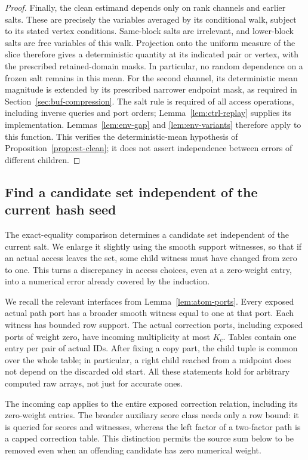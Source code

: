 \begin{proof}
Finally, the clean estimand depends only on rank channels and earlier
salts.  These are precisely the variables averaged by its conditional
walk, subject to its stated vertex conditions.  Same-block salts are
irrelevant, and lower-block salts are free variables of this walk.
Projection onto the uniform measure of the slice therefore gives a
deterministic quantity at its indicated pair or vertex, with the
prescribed retained-domain masks.  In particular, no random dependence
on a frozen salt remains in this mean.  For the second channel, its
deterministic mean magnitude is extended by its prescribed narrower
endpoint mask, as required in Section~\ref{sec:buf-compression}.
The salt rule is required of all access operations, including inverse
queries and port orders; Lemma~\ref{lem:ctrl-replay} supplies its
implementation.  Lemmas~\ref{lem:env-gap} and \ref{lem:env-variants}
therefore apply to this function.  This verifies the deterministic-mean
hypothesis of Proposition~\ref{prop:est-clean}; it does not assert
independence between errors of different children.
\end{proof}

\subsection{Find a candidate set independent of the current hash seed}

The exact-equality comparison determines a candidate set independent of the current salt. We enlarge it slightly using the smooth support witnesses, so that if an actual access leaves the set, some child witness must have changed from zero to one. This turns a discrepancy in access choices, even at a zero-weight entry, into a numerical error already covered by the induction.

We recall the relevant interfaces from Lemma~\ref{lem:atom-ports}.
Every exposed actual path port has a broader smooth witness equal to one
at that port.  Each witness has bounded row support.  The actual
correction ports, including exposed ports of weight zero, have incoming
multiplicity at most $K_c$.  Tables contain one entry per pair of actual
IDs.  After fixing a copy part, the child tuple is common over the whole
table; in particular, a right child reached from a midpoint does not
depend on the discarded old start.  All these statements hold for
arbitrary computed raw arrays, not just for accurate ones.

The incoming cap applies to the entire exposed correction relation,
including its zero-weight entries.  The broader auxiliary score class
needs only a row bound: it is queried for scores and witnesses, whereas
the left factor of a two-factor path is a capped correction table.
This distinction permits the source sum below to be removed even when
an offending candidate has zero numerical weight.

